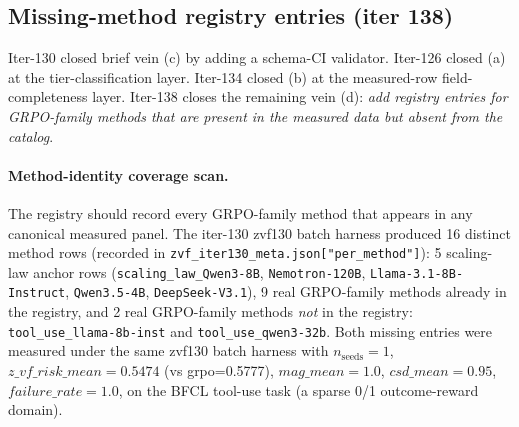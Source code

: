 %
%

\subsection{Missing-method registry entries (iter 138)}
\label{sec:p6-iter138-missing-method}

Iter-130 closed brief vein (c) by adding a schema-CI validator.
Iter-126 closed (a) at the tier-classification layer. Iter-134 closed
(b) at the measured-row field-completeness layer. Iter-138 closes the
remaining vein (d): \emph{add registry entries for GRPO-family methods
that are present in the measured data but absent from the catalog}.

\paragraph{Method-identity coverage scan.}
The registry should record every GRPO-family method that appears in
any canonical measured panel. The iter-130 zvf130 batch harness
produced 16 distinct method rows (recorded in
\texttt{zvf\_iter130\_meta.json["per\_method"]}): 5
scaling-law anchor rows (\texttt{scaling\_law\_Qwen3-8B},
\texttt{Nemotron-120B}, \texttt{Llama-3.1-8B-Instruct},
\texttt{Qwen3.5-4B}, \texttt{DeepSeek-V3.1}), 9 real GRPO-family
methods already in the registry, and 2 real GRPO-family methods
\emph{not} in the registry:
\texttt{tool\_use\_llama-8b-inst} and \texttt{tool\_use\_qwen3-32b}.
Both missing entries were measured under the same zvf130 batch harness
with $n_{\text{seeds}}=1$, $z\_vf\_risk\_mean = 0.5474$ (vs
grpo=0.5777), $\mathit{mag\_mean}=1.0$, $\mathit{csd\_mean}=0.95$,
$\mathit{failure\_rate}=1.0$, on the BFCL tool-use task (a sparse 0/1
outcome-reward domain).

